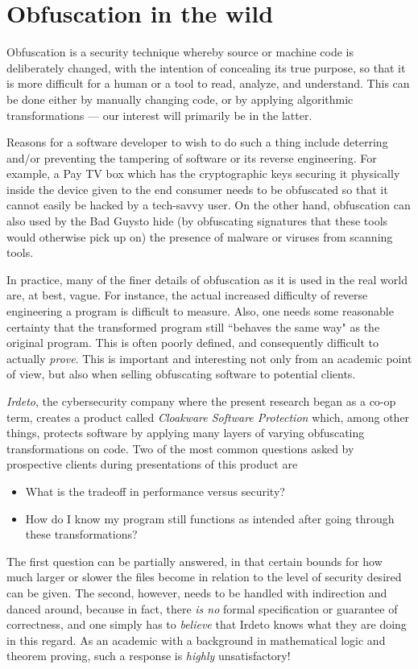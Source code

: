 \documentclass[12pt,notitlepage]{report}
\theoremstyle{plain}
\theoremstyle{definition}
\newcommand{\define}[1]{\emph{#1}\index{#1}}
\numberwithin{equation}{section}
\begin{document}
\section{Obfuscation in the wild}
Obfuscation \cite{CoNa} is a security technique whereby source or machine code is deliberately changed, with the intention of concealing its true purpose, so that it is more difficult for a human or a tool to read, analyze, and understand.  This can be done either by manually changing code, or by applying algorithmic transformations --- our interest will primarily be in the latter.
\par Reasons for a software developer to wish to do such a thing include deterring and/or preventing the tampering of software or its reverse engineering.  For example, a Pay TV box which has the cryptographic keys securing it physically inside the device given to the end consumer needs to be obfuscated so that it cannot easily be hacked by a tech-savvy user.  On the other hand, obfuscation can also used by the Bad Guys\texttrademark to hide (by obfuscating signatures that these tools would otherwise pick up on) the presence of malware or viruses from scanning tools.
\par In practice, many of the finer details of obfuscation as it is used in the real world are, at best, vague.  For instance, the actual increased difficulty of reverse engineering a program is difficult to measure.  Also, one needs some reasonable certainty that the transformed program still ``behaves the same way" as the original program.  This is often poorly defined, and consequently difficult to actually \emph{prove}.  This is important and interesting not only from an academic point of view, but also when selling obfuscating software to potential clients.
\par \define{Irdeto}, the cybersecurity company where the present research began as a co-op term, creates a product called \define{Cloakware Software Protection} \cite{CSP} which, among other things, protects software by applying many layers of varying obfuscating transformations on code.  Two of the most common questions asked by prospective clients during presentations of this product are
\begin{itemize}
    \item What is the tradeoff in performance versus security?
    \item How do I know my program still functions as intended after going through these transformations?
\end{itemize}
The first question can be partially answered, in that certain bounds for how much larger or slower the files become in relation to the level of security desired can be given.  The second, however, needs to be handled with indirection and danced around, because in fact, there \emph{is no} formal specification or guarantee of correctness, and one simply has to \emph{believe} that Irdeto knows what they are doing in this regard.  As an academic with a background in mathematical logic and theorem proving, such a response is \emph{highly} unsatisfactory!
\end{document}
